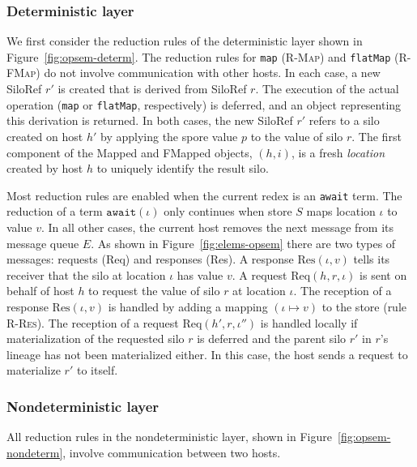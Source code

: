 \documentclass[preprint]{sigplanconf}
\theoremstyle{definition}
\theoremstyle{definition}
\begin{document}
\subsubsection{Deterministic layer}
\label{sec:det-layer}

We first consider the reduction rules of the deterministic layer shown in
Figure~\ref{fig:opsem-determ}. The reduction rules for \texttt{map}
(\textsc{R-Map}) and \texttt{flatMap} (\textsc{R-FMap}) do not involve
communication with other hosts. In each case, a new SiloRef $r'$ is created
that is derived from SiloRef $r$. The execution of the actual operation
(\texttt{map} or \texttt{flatMap}, respectively) is deferred, and an object
representing this derivation is returned. In both cases, the new SiloRef $r'$
refers to a silo created on host $h'$ by applying the spore value $p$ to the
value of silo $r$. The first component of the Mapped and FMapped objects, $(h,
i)$, is a fresh \emph{location} created by host $h$ to uniquely identify the
result silo.

Most reduction rules are enabled when the current redex is an \texttt{await}
term. The reduction of a term $\texttt{await}(\iota)$ only continues when store
$S$ maps location $\iota$ to value $v$. In all other cases, the current host
removes the next message from its message queue $E$. As shown in
Figure~\ref{fig:elems-opsem} there are two types of messages: requests (Req)
and responses (Res). A response $\text{Res}(\iota, v)$ tells its receiver that
the silo at location $\iota$ has value $v$. A request $\text{Req}(h, r, \iota)$
is sent on behalf of host $h$ to request the value of silo $r$ at location
$\iota$. The reception of a response $\text{Res}(\iota, v)$ is handled by
adding a mapping $(\iota \mapsto v)$ to the store (rule \textsc{R-Res}). The
reception of a request $\text{Req}(h', r, \iota'')$ is handled locally if
materialization of the requested silo $r$ is deferred and the parent silo $r'$
in $r$'s lineage has not been materialized either. In this case, the host sends
a request to materialize $r'$ to itself.



\subsubsection{Nondeterministic layer}
\label{sec:nondet-layer}

All reduction rules in the nondeterministic layer, shown in
Figure~\ref{fig:opsem-nondeterm}, involve communication between two hosts.
\end{document}
